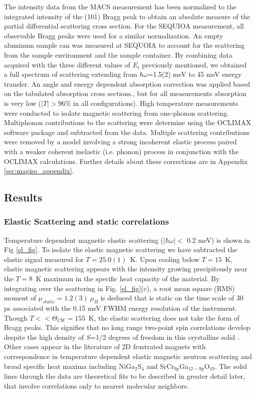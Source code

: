 \documentclass[%
 reprint,
superscriptaddress,
 amsmath,amssymb,
 aps,
 prb,
]{revtex4-2}
\begin{document}
The intensity data from the MACS measurement has been normalized to the integrated intensity of the (10$\bar{1}$) Bragg peak to obtain an absolute measure of the partial differential scattering cross section. For the SEQUIOA measurement, all observable Bragg peaks were used for a similar normalization. An empty aluminum sample can was measured at SEQUOIA to account for the scattering from the sample environment and the sample container. By combining data acquired with the three different values of $E_i$ previously mentioned, we obtained a full spectrum of scattering extending from  $\hbar\omega$=1.5(2) meV to 45 meV energy transfer. An angle and energy dependent absorption correction was applied based on the tabulated absorption cross sections.\cite{sears1992neutron}, but for all measurements absorption is very low ($|T|>96\%$ in all configurations). High temperature measurements were conducted to isolate magnetic scattering from one-phonon scattering. Multiphonon contributions to the scattering were determine using the OCLIMAX software package \cite{Cheng2019SimulationOCLIMAX} and subtracted from the data. Multiple scattering contributions were removed by a model involving a strong incoherent elastic process paired with a weaker coherent inelastic (i.e. phonon) process in conjunction with the OCLIMAX calculations. Further details about these corrections are in Appendix \ref{sec:magiso_appendix}. 

\subsection{Results}
\subsubsection{Elastic Scattering and static correlations}
Temperature dependent magnetic elastic scattering ($|\hbar\omega|<$ 0.2 meV) is shown in Fig \ref{el_fig}. To isolate the elastic magnetic scattering we have subtracted the elastic signal measured for $T=25.0(1)$~K. Upon cooling below $T=15$~K, elastic magnetic scattering appears with the intensity growing precipitously near the $T=8$~K maximum in the specific heat capacity of the material. By integrating over the scattering in Fig. \ref{el_fig}(c), a root mean square (RMS)  moment of $\mu_{static}=1.2(3)\ \mu_B$ is deduced that is static on the time scale of 30 ps associated with the 0.15 meV FWHM energy resolution of the instrument. Though $T<<\Theta_{CW}=155$~K, the elastic scattering does not take the form of Bragg peaks. This signifies that no long range two-point spin correlations develop despite the high density of $S$=1/2 degrees of freedom in this crystalline solid \cite{Nguyen2018GeometricallyInsulator}. Other cases appear in the literature of 2D frustrated magnets with correspondence in temperature dependent elastic magnetic neutron scattering and broad specific heat maxima including NiGa$_2$S$_4$\cite{Nakatsuji2005Physics:Lattice} and SrCr$_{9p}$Ga$_{12-9p}$O$_{19}$\cite{Lee1996Spin-glassMagnet}. The solid lines through the data are theoretical fits to be described in greater detail later, that involve correlations only to nearest molecular neighbors.
\end{document}
